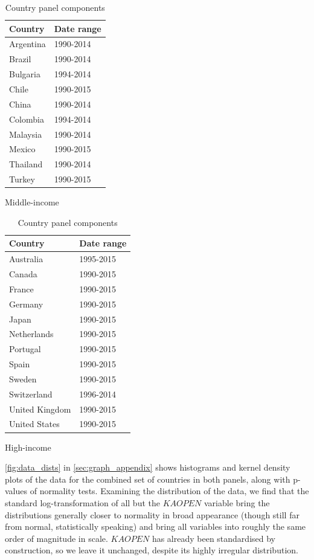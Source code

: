 \documentclass[12pt,a4paper]{article}
\begin{document}
\renewcommand{\arraystretch}{1}
\begin{table}[htbp]
\centering
\begin{subtable}{0.45\textwidth}
\centering
\begin{tabular}{ll}
\toprule
   Country & Date range \\
\midrule
 Argentina &  1990-2014 \\
    Brazil &  1990-2014 \\
  Bulgaria &  1994-2014 \\
     Chile &  1990-2015 \\
     China &  1990-2014 \\
  Colombia &  1994-2014 \\
  Malaysia &  1990-2014 \\
    Mexico &  1990-2015 \\
  Thailand &  1990-2014 \\
    Turkey &  1990-2015 \\
\bottomrule
\end{tabular}
\caption{Middle-income}
\end{subtable}
\begin{subtable}{0.45\textwidth}
\centering
\begin{tabular}{ll}
\toprule
        Country & Date range \\
\midrule
      Australia &  1995-2015 \\
         Canada &  1990-2015 \\
         France &  1990-2015 \\
        Germany &  1990-2015 \\
          Japan &  1990-2015 \\
    Netherlands &  1990-2015 \\
       Portugal &  1990-2015 \\
          Spain &  1990-2015 \\
         Sweden &  1990-2015 \\
    Switzerland &  1996-2014 \\
 United Kingdom &  1990-2015 \\
  United States &  1990-2015 \\
\bottomrule
\end{tabular}
\caption{High-income}
\end{subtable}
\caption{Country panel components}
\label{tab:countries}
\end{table}

\cref{fig:data_dists} in \cref{sec:graph_appendix} shows histograms and kernel density plots of the data for the combined set of countries in both panels, along with p-values of \cite{dagostinoTestsDepartureNormality1973} normality tests.
Examining the distribution of the data, we find that the standard log-transformation of all but the $KAOPEN$ variable bring the distributions generally closer to normality in broad appearance (though still far from normal, statistically speaking) and bring all variables into roughly the same order of magnitude in scale.
$KAOPEN$ has already been standardised by construction, so we leave it unchanged, despite its highly irregular distribution.
\end{document}
